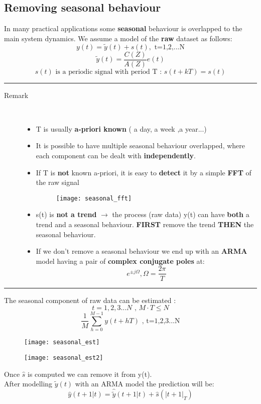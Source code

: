 \subsection{Removing seasonal behaviour}
In many practical applications some \textbf{seasonal} behaviour is overlapped to the main system dynamics. We assume a model of the \textbf{raw} dataset as follows:
$$ y(t) = \tilde{y}(t) + s(t) ,\text{ t=1,2,...N}$$
$$ \tilde{y}(t) = \frac{C(Z)}{A(Z)}e(t)$$
$$ s(t) \text{ is a periodic signal with period T : } s(t+kT)=s(t)$$
\par\noindent\rule{\textwidth}{0.4pt}
\begin{description}
\item [Remark]\hfill\\
\begin{itemize}
\item T is usually \textbf{a-priori known} ( a day, a week ,a year...)
\item It is possible to have multiple seasonal behaviour overlapped, where each component can be dealt with \textbf{independently}.
\item If T is \textbf{not} known a-priori, it is easy to \textbf{detect} it by a simple \textbf{FFT} of the raw signal
\begin{figure}[H]
 \centering
  \texttt{[image: seasonal\_fft]}
\end{figure}
\item s(t) is \textbf{not a trend} $\to$  the process (raw data) y(t) can have \textbf{both} a trend and a seasonal behaviour. \textbf{FIRST} remove the trend \textbf{THEN} the seasonal behaviour.
\item If we don't remove a seasonal behaviour we end up with an \textbf{ARMA} model having a pair of \textbf{complex conjugate poles} at:
$$ e^{\pm j\Omega} , \Omega =\frac{2\pi}{T}$$  
\end{itemize}
\end{description}
\par\noindent\rule{\textwidth}{0.4pt}
The seasonal component of raw data can be estimated :
$$ t=1,2,3...N \text{  ,  } M\cdot T \leq N$$
\[
\boxed{\frac{1}{M}\sum\limits_{h=0}^{M-1}y(t+hT) \text{  , t=1,2,3...N}}
\]
\begin{figure}[H]
 \centering
  \texttt{[image: seasonal\_est]}
\end{figure}
\begin{figure}[H]
 \centering
  \texttt{[image: seasonal\_est2]}
\end{figure}
Once $\hat{s}$ is computed we can remove it from y(t).\\
After modelling $\tilde{y}(t)$ with an ARMA model the prediction will be:
\[
\boxed{\hat{y}(t+1|t) = \hat{\tilde{y}}(t+1|t) + \hat{s}(|t+1|_T)}
\]

